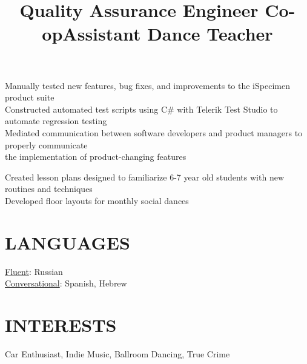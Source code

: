\documentclass[resmargin]{res}
\begin{document}
\begin{resume}
\title{\textbf{Quality Assurance Engineer Co-op}}
\begin{position}
\hspace*{5mm}\textbullet\hspace*{1.5mm}Manually tested new features, bug fixes, and improvements to the iSpecimen product suite\\
\hspace*{5mm}\textbullet\hspace*{1.5mm}Constructed automated test scripts using C\# with Telerik Test Studio to automate regression testing\\
\hspace*{5mm}\textbullet\hspace*{1.5mm}Mediated communication between software developers and product managers to properly communicate \\\hspace*{8.5mm}the implementation of product-changing features
\end{position}

\title{\textbf{Assistant Dance Teacher}}
\begin{position}
\hspace*{5mm}\textbullet\hspace*{1.5mm}Created lesson plans designed to familiarize 6-7 year old students with new routines and techniques\\
\hspace*{5mm}\textbullet\hspace*{1.5mm}Developed floor layouts for monthly social dances
\end{position}

\section{LANGUAGES}
\underline{Fluent}: Russian\\
\underline{Conversational}: Spanish, Hebrew

\section{INTERESTS}
Car Enthusiast, Indie Music, Ballroom Dancing, True Crime
\end{resume}
\end{document}
